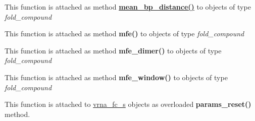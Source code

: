 \begin{DoxyRefList}
\item[\label{wrappers__wrappers000056}%
\Hypertarget{wrappers__wrappers000056}%
Global \hyperlink{group__pf__fold_gaa6b8983b559b9ef4b2e1b31113ea317b}{vrna\+\_\+mean\+\_\+bp\+\_\+distance} (vrna\+\_\+fold\+\_\+compound\+\_\+t $\ast$vc)]This function is attached as method {\bfseries \hyperlink{group__pf__fold_ga79cbc375af65f11609feb6b055269e7d}{mean\+\_\+bp\+\_\+distance()}} to objects of type {\itshape fold\+\_\+compound}  
\item[\label{wrappers__wrappers000046}%
\Hypertarget{wrappers__wrappers000046}%
Global \hyperlink{group__mfe__fold_gabd3b147371ccf25c577f88bbbaf159fd}{vrna\+\_\+mfe} (vrna\+\_\+fold\+\_\+compound\+\_\+t $\ast$vc, char $\ast$structure)]This function is attached as method {\bfseries mfe()} to objects of type {\itshape fold\+\_\+compound}  
\item[\label{wrappers__wrappers000047}%
\Hypertarget{wrappers__wrappers000047}%
Global \hyperlink{group__mfe__cofold_gaab22d10c1190f205f16a77cab9d5d3ee}{vrna\+\_\+mfe\+\_\+dimer} (vrna\+\_\+fold\+\_\+compound\+\_\+t $\ast$vc, char $\ast$structure)]This function is attached as method {\bfseries mfe\+\_\+dimer()} to objects of type {\itshape fold\+\_\+compound}  
\item[\label{wrappers__wrappers000048}%
\Hypertarget{wrappers__wrappers000048}%
Global \hyperlink{group__local__mfe__fold_ga689df235a1915a1ad56e377383c044ce}{vrna\+\_\+mfe\+\_\+window} (vrna\+\_\+fold\+\_\+compound\+\_\+t $\ast$vc, F\+I\+LE $\ast$file)]This function is attached as method {\bfseries mfe\+\_\+window()} to objects of type {\itshape fold\+\_\+compound}  
\item[\label{wrappers__wrappers000052}%
\Hypertarget{wrappers__wrappers000052}%
Global \hyperlink{group__energy__parameters_gac40dc82e48a72a97cfc58b9da08a7792}{vrna\+\_\+params\+\_\+reset} (vrna\+\_\+fold\+\_\+compound\+\_\+t $\ast$vc, vrna\+\_\+md\+\_\+t $\ast$md\+\_\+p)]This function is attached to \hyperlink{group__fold__compound_structvrna__fc__s}{vrna\+\_\+fc\+\_\+s} objects as overloaded {\bfseries params\+\_\+reset()} method.


\end{DoxyRefList}
